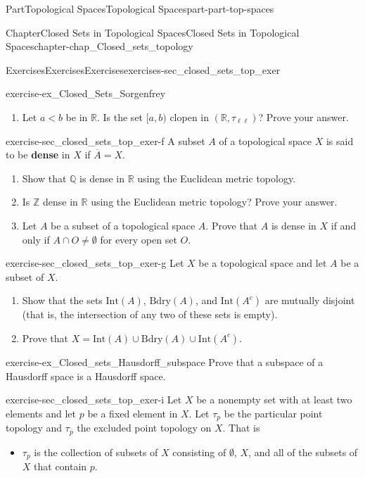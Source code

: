 \documentclass[oneside,10pt,]{book}
\newcommand{\terminology}[1]{\textbf{#1}}
\numberwithin{equation}{chapter}
\newcommand{\Z}{\mathbb{Z}}
\newcommand{\Q}{\mathbb{Q}}
\newcommand{\R}{\mathbb{R}}
\newcommand{\Int}{\text{Int}}
\newcommand{\Bdry}{\text{Bdry}}
\newcommand{\lt}{<}
\begin{document}
\begin{partptx}{Part}{Topological Spaces}{}{Topological Spaces}{}{}{part-part-top-spaces}
\begin{chapterptx}{Chapter}{Closed Sets in Topological Spaces}{}{Closed Sets in Topological Spaces}{}{}{chapter-chap_Closed_sets_topology}
\begin{exercises-section}{Exercises}{Exercises}{}{Exercises}{}{}{exercises-sec_closed_sets_top_exer}
\begin{divisionexercise}{5}{}{}{exercise-ex_Closed_Sets_Sorgenfrey}
\begin{enumerate}[font=\bfseries,label=(\alph*),ref=\alph*]
\item{}Let \(a \lt b\) be in \(\R\). Is the set \([a,b)\) clopen in \((\R, \tau_{\ell \ell})\)? Prove your answer.%
\end{enumerate}%
\end{divisionexercise}%
\begin{divisionexercise}{6}{}{}{exercise-sec_closed_sets_top_exer-f}%
A subset \(A\) of a topological space \(X\) is said to be \terminology{dense} in \(X\) if \(\overline{A} = X\).%
\begin{enumerate}[font=\bfseries,label=(\alph*),ref=\alph*]%
\item{}Show that \(\Q\) is dense in \(\R\) using the Euclidean metric topology.%
\item{}Is \(\Z\) dense in \(\R\) using the Euclidean metric topology? Prove your answer.%
\item{}Let \(A\) be a subset of a topological space \(A\). Prove that \(A\) is dense in \(X\) if and only if \(A \cap O \neq \emptyset\) for every open set \(O\).%
\end{enumerate}%
\end{divisionexercise}%
\begin{divisionexercise}{7}{}{}{exercise-sec_closed_sets_top_exer-g}%
Let \(X\) be a topological space and let \(A\) be a subset of \(X\).%
\begin{enumerate}[font=\bfseries,label=(\alph*),ref=\alph*]%
\item{}Show that the sets \(\Int(A)\), \(\Bdry(A)\), and \(\Int(A^c)\) are mutually disjoint (that is, the intersection of any two of these sets is empty).%
\item{}Prove that \(X = \Int(A) \cup \Bdry(A) \cup \Int(A^c)\).%
\end{enumerate}%
\end{divisionexercise}%
\begin{divisionexercise}{8}{}{}{exercise-ex_Closed_sets_Hausdorff_subspace}%
Prove that a subspace of a Hausdorff space is a Hausdorff space.%
\end{divisionexercise}%
\begin{divisionexercise}{9}{}{}{exercise-sec_closed_sets_top_exer-i}%
Let \(X\) be a nonempty set with at least two elements and let \(p\) be a fixed element in \(X\). Let \(\tau_p\) be the particular point topology and \(\tau_{\overline{p}}\) the excluded point topology on \(X\). That is%
\begin{itemize}[label=\textbullet]
\item{}\(\tau_{p}\) is the collection of subsets of \(X\) consisting of \(\emptyset\), \(X\), and all of the subsets of \(X\) that contain \(p\).%

\end{itemize}
\end{divisionexercise}
\end{exercises-section}
\end{chapterptx}
\end{partptx}
\end{document}
